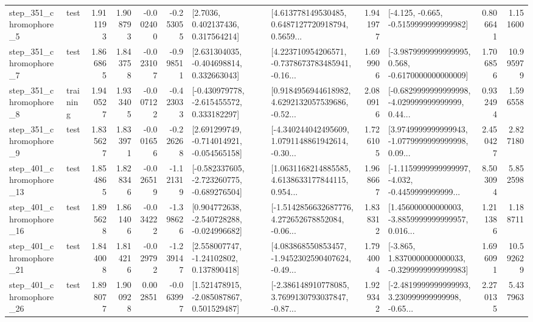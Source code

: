 \begin{tabular}{llrrrrllrlrr}
   step\_351\_chromophore\_5 &      test &      1.911193 &    1.908793 &     -0.002400 & -0.253055 &          [2.7036, 0.402137436, 0.317564214] &  [4.613778149530485, 0.6487127720918794, 0.5659... &       1.941977 &              [-4.125, -0.665, -0.5159999999999982] &            0.806641 &          1.151600 \\
   step\_351\_chromophore\_7 &      test &      1.866865 &    1.843758 &     -0.023107 & -0.998511 &    [2.631304035, -0.404698814, 0.332663043] &  [4.223710954206571, -0.7378673783485941, -0.16... &       1.699906 &  [-3.9879999999999995, 0.568, -0.6170000000000009] &            1.706856 &         10.995979 \\
   step\_351\_chromophore\_8 &  training &      1.940527 &    1.933405 &     -0.007122 & -0.423033 &   [-0.430979778, -2.615455572, 0.333182297] &  [0.9184956944618982, 4.6292132057539686, -0.52... &       2.080916 &  [-0.6829999999999998, -4.029999999999999, 0.44... &            0.932494 &          1.596558 \\
   step\_351\_chromophore\_9 &      test &      1.835627 &    1.833971 &     -0.001656 & -0.226268 &   [2.691299749, -0.714014921, -0.054565158] &  [-4.340244042495609, 1.0791148861942614, -0.30... &       1.726105 &  [3.9749999999999943, -1.0779999999999998, 0.09... &            2.450427 &          2.827180 \\
  step\_401\_chromophore\_13 &      test &      1.854865 &    1.828346 &     -0.026519 & -1.121319 &  [-0.582337605, -2.723260775, -0.689276504] &  [1.0631168214885585, 4.6138633177844115, 0.954... &       1.968667 &  [-1.1159999999999997, -4.032, -0.4459999999999... &            8.503094 &          5.852598 \\
  step\_401\_chromophore\_16 &      test &      1.895628 &    1.861406 &     -0.034222 & -1.398626 &   [0.904772638, -2.540728288, -0.024996682] &  [-1.5142856632687776, 4.272652678852084, -0.06... &       1.838312 &  [1.456000000000003, -3.8859999999999957, 0.016... &            1.211386 &          1.188711 \\
  step\_401\_chromophore\_21 &      test &      1.844008 &    1.814216 &     -0.029792 & -1.239147 &     [2.558007747, -1.24102802, 0.137890418] &  [4.083868550853457, -1.9452302590407624, -0.49... &       1.794004 &  [-3.865, 1.8370000000000033, -0.3299999999999983] &            1.696091 &         10.592629 \\
  step\_401\_chromophore\_26 &      test &      1.898077 &    1.900928 &      0.002851 & -0.063997 &    [1.521478915, -2.085087867, 0.501529487] &  [-2.386148910778085, 3.7699130793037847, -0.87... &       1.929342 &  [-2.4819999999999993, 3.230999999999998, -0.65... &            2.270135 &          5.437963 \\

\end{tabular}

